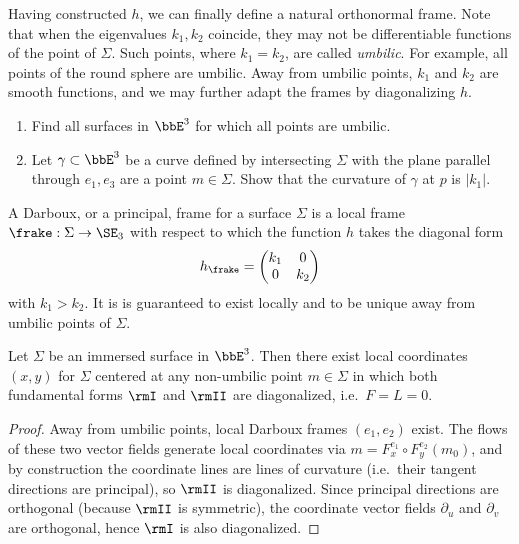 Having constructed $h$, we can finally define a natural orthonormal frame. Note that when the eigenvalues $k_1,k_2$ coincide, they may not be differentiable functions of the point of $\Sigma$. Such points, where $k_1=k_2$, are called \emph{umbilic}. For example, all points of the round sphere are umbilic. Away from umbilic points, $k_1$ and $k_2$ are smooth functions, and we may further adapt the frames by diagonalizing $h$. 

\begin{xca}
    \begin{enumerate}
        \item Find all surfaces in $\bbE^3$ for which all points are umbilic.
        \item Let $\gamma\subset\bbE^3$ be a curve defined by intersecting $\Sigma$ with the plane parallel through $e_1,e_3$ are a point $m\in\Sigma$. Show that the curvature of $\gamma$ at $p$ is $|k_1|$.
    \end{enumerate}
\end{xca}


\begin{defn}
    A Darboux, or a principal, frame for a surface $\Sigma$ is a local frame $\frake:\Sigma\to \SE_3$ with respect to which the function $h$ takes the diagonal form 
    \[h_\frake=\begin{pmatrix}
        k_1&0\\
        0& k_2
    \end{pmatrix}\]
    with $k_1>k_2$. It is is guaranteed to exist locally and to be unique away from umbilic points of $\Sigma$.
\end{defn}

\begin{lem}\label{lem line of curvature coordinates}
    Let $\Sigma$ be an immersed surface in $\bbE^3$. Then there exist local coordinates $(x,y)$ for $\Sigma$ centered at any non-umbilic point $m\in\Sigma$ in which both fundamental forms $\rmI$ and $\rmII$ are diagonalized, i.e.\ $F=L=0$. 
\end{lem}
\begin{proof}
    Away from umbilic points, local Darboux frames $(e_1,e_2)$ exist. The flows of these two vector fields generate local coordinates via $m=F^{e_1}_x\circ F^{e_2}_y(m_0)$, and by construction the coordinate lines are lines of curvature (i.e.\ their tangent directions are principal), so $\rmII$ is diagonalized. Since principal directions are orthogonal (because $\rmII$ is symmetric), the coordinate vector fields $\partial_u$ and $\partial_v$ are orthogonal, hence $\rmI$ is also diagonalized.
\end{proof}

